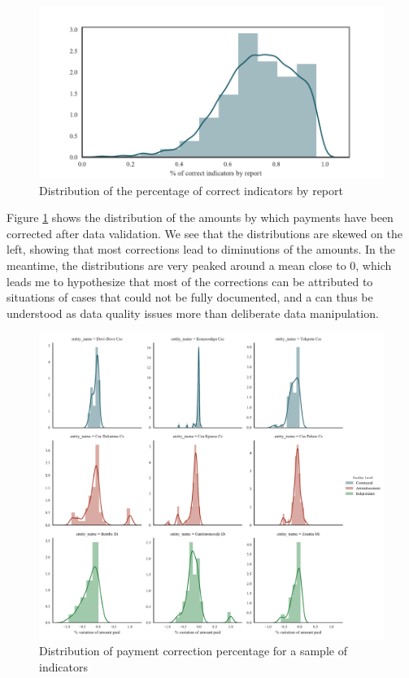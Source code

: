 \begin{center}
\begin{figure}[ht]
\includegraphics[width=\textwidth]{figure/correct_dist.pdf}
\caption{Distribution of the percentage of correct indicators by report}
\end{figure}
\end{center}

Figure \ref{fig:facility_correction_distribution} shows the distribution of the amounts by which payments have been corrected after data validation. We see that the distributions are skewed on the left, showing that most corrections lead to diminutions of the amounts. In the meantime, the distributions are very peaked around a mean close to 0, which leads me to hypothesize that most of the corrections can be attributed to situations of cases that could not be fully documented, and a can thus be understood as data quality issues more than deliberate data manipulation.

\begin{center}
\begin{figure}[ht]
\includegraphics[width=\textwidth]{figure/facility_correction_distribution.pdf}
\caption{Distribution of payment correction percentage for a sample of indicators}
\label{fig:facility_correction_distribution}
\end{figure}
\end{center}

